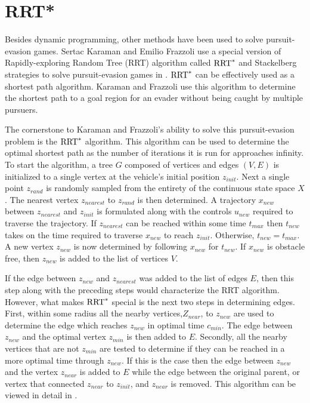 \section{RRT*}
Besides dynamic programming, other methods have been used to solve pursuit-evasion games. Sertac Karaman and Emilio Frazzoli use a special version of Rapidly-exploring Random Tree (RRT) algorithm called $\textnormal{RRT}^*$ and Stackelberg strategies to solve pursuit-evasion games in \cite{karaman}. $\textnormal{RRT}^*$ can be effectively used as a shortest path algorithm. Karaman and Frazzoli use this algorithm to determine the shortest path to a goal region for an evader without being caught by multiple pursuers.

The cornerstone to Karaman and Frazzoli's ability to solve this pursuit-evasion problem is the $\textnormal{RRT}^*$ algorithm. This algorithm can be used to determine the optimal shortest path as the number of iterations it is run for approaches infinity. To start the algorithm, a tree $G$ composed of vertices and edges $(V,E)$ is initialized to a single vertex at the vehicle's initial position $z_{init}$. Next a single point $z_{rand}$ is randomly sampled from the entirety of the continuous state space $X$. The nearest vertex $z_{nearest}$ to $z_{rand}$ is then determined. A trajectory $x_{new}$ between $z_{nearest}$ and $z_{init}$ is formulated along with the controls $u_{new}$ required to traverse the trajectory. If $z_{nearest}$ can be reached within some time $t_{max}$ then $t_{new}$ takes on the time required to traverse $x_{new}$ to reach $z_{init}$. Otherwise, $t_{new} = t_{max}$. A new vertex $z_{new}$ is now determined by following $x_{new}$ for $t_{new}$. If $x_{new}$ is obstacle free, then $z_{new}$ is added to the list of vertices $V$. 

If the edge between $z_{new}$ and $z_{nearest}$ was added to the list of edges $E$, then this step along with the preceding steps would characterize the RRT algorithm. However, what makes $\textnormal{RRT}^*$ special is the next two steps in determining edges. First, within some radius all the nearby vertices,$Z_{near}$, to $z_{new}$ are used to determine the edge which reaches $z_{new}$ in optimal time $c_{min}$. The edge between $z_{new}$ and the optimal vertex $z_{min}$ is then added to $E$. Secondly, all the nearby vertices that are not $z_{min}$ are tested to determine if they can be reached in a more optimal time through $z_{new}$. If this is the case then the edge between $z_{new}$ and the vertex $z_{near}$ is added to $E$ while the edge between the original parent, or vertex that connected $z_{near}$ to $z_{init}$, and $z_{near}$ is removed. This algorithm can be viewed in detail in . \cite{karaman} 
  
